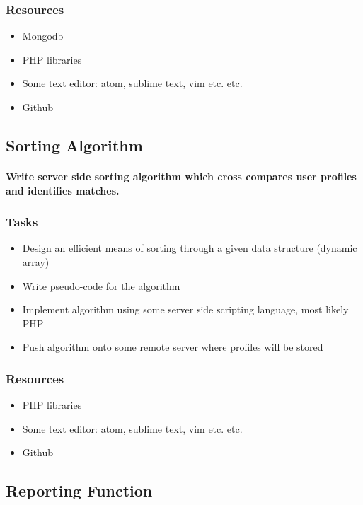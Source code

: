\documentclass[12pt]{article}
\begin{document}
	  	\subsubsection{\bf Resources}
				\begin{itemize}
					\item Mongodb
					\item PHP libraries
 					\item Some text editor: atom, sublime text, vim etc. etc.
 					\item Github
				\end{itemize}

		\subsection{\bf Sorting Algorithm}
			\paragraph{Write server side sorting algorithm which cross compares user profiles and identifies matches.}
			\subsubsection{\bf Tasks}
				\begin{itemize}
					\item	Design an efficient means of sorting through a given data structure (dynamic array)
					\item	Write pseudo-code for the algorithm
					\item Implement algorithm using some server side scripting language, most likely PHP
					\item Push algorithm onto some remote server where profiles will be stored
				\end{itemize}
	  	\subsubsection{\bf Resources}
				\begin{itemize}
 					\item PHP libraries
			 		\item Some text editor: atom, sublime text, vim etc. etc.
			 		\item Github
				\end{itemize}

		\subsection{\bf Reporting Function}
\end{document}
